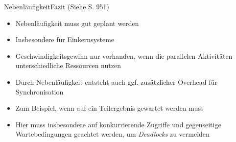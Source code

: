 \begin{frame}{Nebenläufigkeit}{Fazit (Siehe \cite{ullenboom2018java} S. 951)}
    \begin{itemize}
        \item Nebenläufigkeit muss gut geplant werden
        \item Insbesondere für Einkernsysteme
        \item Geschwindigkeitsgewinn nur vorhanden, wenn die parallelen Aktivitäten unterschiedliche Ressourcen nutzen
        \item Durch Nebenläufigkeit entsteht auch ggf. zusätzlicher Overhead für Synchronisation
        \item Zum Beispiel, wenn auf ein Teilergebnis gewartet werden muss
        \item Hier muss insbesondere auf konkurrierende Zugriffe und gegenseitige Wartebedingungen geachtet werden, um \textit{Deadlocks} zu vermeiden
    \end{itemize}
\end{frame}

